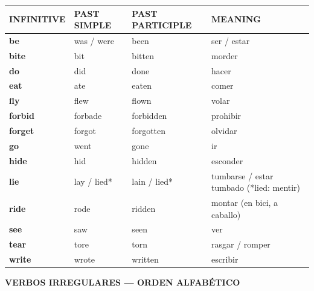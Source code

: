 \documentclass[11pt,a4paper]{article}
\newcommand{\cab}[1]{\small\textbf{\color{#1O}INFINITIVE} & \small\textbf{\color{#1O}PAST SIMPLE} & \small\textbf{\color{#1O}PAST\,PARTICIPLE} & \small\textbf{\color{#1O}MEANING}\\[1pt]}
\begin{document}
\begin{longtable}{>{\bfseries}p{2.8cm}p{3.5cm}p{3.7cm}>{\raggedright\arraybackslash}p{6.6cm}}
\cab{azul}\endhead
\textcolor{azulO}{be} & \textcolor{azulO}{was / were} & \textcolor{azulO}{been} & \textcolor{azulO}{ser / estar}\\
\textcolor{azulO}{bite} & \textcolor{azulO}{bit} & \textcolor{azulO}{bitten} & \textcolor{azulO}{morder}\\
\textcolor{azulO}{do} & \textcolor{azulO}{did} & \textcolor{azulO}{done} & \textcolor{azulO}{hacer}\\
\textcolor{azulO}{eat} & \textcolor{azulO}{ate} & \textcolor{azulO}{eaten} & \textcolor{azulO}{comer}\\
\textcolor{azulO}{fly} & \textcolor{azulO}{flew} & \textcolor{azulO}{flown} & \textcolor{azulO}{volar}\\
\textcolor{azulO}{forbid} & \textcolor{azulO}{forbade} & \textcolor{azulO}{forbidden} & \textcolor{azulO}{prohibir}\\
\textcolor{azulO}{forget} & \textcolor{azulO}{forgot} & \textcolor{azulO}{forgotten} & \textcolor{azulO}{olvidar}\\
\textcolor{azulO}{go} & \textcolor{azulO}{went} & \textcolor{azulO}{gone} & \textcolor{azulO}{ir}\\
\textcolor{azulO}{hide} & \textcolor{azulO}{hid} & \textcolor{azulO}{hidden} & \textcolor{azulO}{esconder}\\
\textcolor{azulO}{lie} & \textcolor{azulO}{lay / lied*} & \textcolor{azulO}{lain / lied*} & \textcolor{azulO}{tumbarse / estar tumbado (*lied: mentir)}\\
\textcolor{azulO}{ride} & \textcolor{azulO}{rode} & \textcolor{azulO}{ridden} & \textcolor{azulO}{montar (en bici, a caballo)}\\
\textcolor{azulO}{see} & \textcolor{azulO}{saw} & \textcolor{azulO}{seen} & \textcolor{azulO}{ver}\\
\textcolor{azulO}{tear} & \textcolor{azulO}{tore} & \textcolor{azulO}{torn} & \textcolor{azulO}{rasgar / romper}\\
\textcolor{azulO}{write} & \textcolor{azulO}{wrote} & \textcolor{azulO}{written} & \textcolor{azulO}{escribir}\\
\end{longtable}
\newpage
\begin{center}{\Large\bfseries VERBOS IRREGULARES — ORDEN ALFABÉTICO}\end{center}\vspace{-2mm}
\vspace{3mm}
\end{document}
